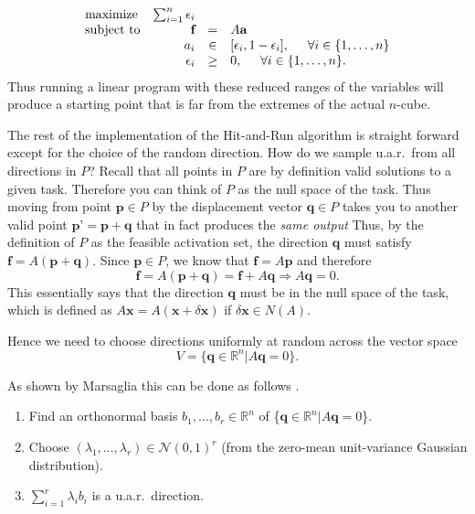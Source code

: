 \begin{equation}\label{eq:LP_r}
\begin{array}{lrcl}
\mbox{maximize} & \sum_{i=1}^n \epsilon_i \\ 
\mbox{subject to} & \textbf{f} &=& A\textbf{a}\\
  & a_i &\in& [\epsilon_i, 1- \epsilon_i], \hspace{5mm} \forall i \in \{1,\dots,n\}  \\
  & \epsilon_i &\geq& 0, \hspace{5mm} \forall i \in \{1,\dots,n\}.  
\end{array}
\end{equation}
Thus running a linear program with these reduced ranges of the variables will produce a starting point that is far from the extremes of the actual $n$-cube.

The rest of the implementation of the Hit-and-Run algorithm is straight forward except for the choice of the random direction. How do we sample u.a.r.\ from all directions in $P$? 
Recall that all points in $P$ are by definition valid solutions to a given task. Therefore you can think of  $P$ as the null space of the task. Thus moving from  point $\textbf{p} \in P$ by the displacement vector  $\textbf{q} \in P$ takes you to another valid point $\textbf{p'}=\textbf{p}  + \textbf{q}$ that in fact produces the \emph{same output}
Thus, by the definition of $P$ as the feasible activation set, the direction $\textbf{q}$ must satisfy $\textbf{f} = A(\textbf{p}+\textbf{q})$. Since $\textbf{p} \in P$, we know that $\textbf{f} = A\textbf{p}$ and therefore 
\[\textbf{f} = A(\textbf{p} + \textbf{q}) = \textbf{f} + A\textbf{q} \Rightarrow A\textbf{q} = 0. \]
This essentially says that the direction $\textbf{q} $ must be in the null space of the task, which is defined as  $A\textbf{x} = A(\textbf{x} + \delta\textbf{x})$ if $\delta\textbf{x} \in N(A)$. 

Hence we need to choose directions uniformly at random across the vector space 
\[V = \{\textbf{q} \in \mathbb{R}^n | A\textbf{q} = 0\}.\]

As shown by Marsaglia this can be done as follows \cite{Marsaglia}.
\begin{enumerate}
\item
Find an orthonormal basis $b_1, \dots, b_r \in \mathbb{R}^{n}$ of \{$\textbf{q} \in \mathbb{R}^n | A\textbf{q} = 0$\}.
\item
Choose $(\lambda_1, \dots, \lambda_r) \in \mathcal{N}(0,1)^r$ (from the zero-mean unit-variance Gaussian distribution).
\item
$\sum_{i=1}^r \lambda_i b_i$ is a u.a.r.\ direction.
\end{enumerate}

